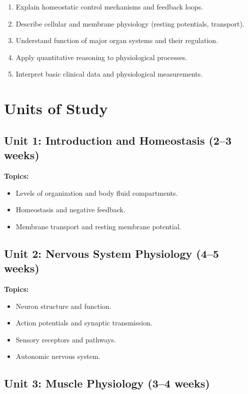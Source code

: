 \documentclass[12pt,oneside]{book}
\begin{document}
\begin{enumerate}
    \item Explain homeostatic control mechanisms and feedback loops.
    \item Describe cellular and membrane physiology (resting potentials, transport).
    \item Understand function of major organ systems and their regulation.
    \item Apply quantitative reasoning to physiological processes.
    \item Interpret basic clinical data and physiological measurements.
\end{enumerate}

\section{Units of Study}

\subsection{Unit 1: Introduction and Homeostasis (2--3 weeks)}

\textbf{Topics:}
\begin{itemize}
    \item Levels of organization and body fluid compartments.
    \item Homeostasis and negative feedback.
    \item Membrane transport and resting membrane potential.
\end{itemize}

\subsection{Unit 2: Nervous System Physiology (4--5 weeks)}

\textbf{Topics:}
\begin{itemize}
    \item Neuron structure and function.
    \item Action potentials and synaptic transmission.
    \item Sensory receptors and pathways.
    \item Autonomic nervous system.
\end{itemize}

\subsection{Unit 3: Muscle Physiology (3--4 weeks)}
\end{document}
